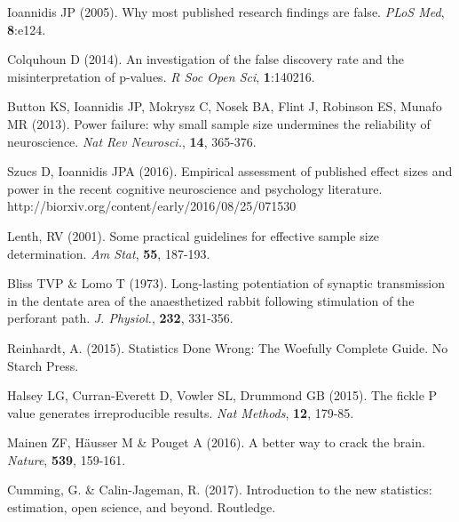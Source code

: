 \documentclass[a4paper,11pt]{article}
\begin{document}
\begin{thebibliography}{199}

Ioannidis JP (2005).
Why most published research findings are false.
{\em PLoS Med}, {\bf 8}:e124. 

Colquhoun D (2014).
An investigation of the false discovery rate and the misinterpretation of p-values.
{\em R Soc Open Sci}, {\bf 1}:140216. 

Button KS, Ioannidis JP, Mokrysz C, Nosek BA, Flint J, Robinson ES,
Munafo MR (2013).
Power failure: why small sample size undermines the reliability of neuroscience.
{\em Nat Rev Neurosci.}, {\bf 14}, 365-376. 

Szucs D, Ioannidis JPA (2016).
Empirical assessment of published effect sizes and power in the recent
cognitive neuroscience and psychology literature.
http://biorxiv.org/content/early/2016/08/25/071530

Lenth, RV (2001).
Some practical guidelines for effective sample size determination.
{\em Am Stat}, {\bf 55}, 187-193.

Bliss TVP \& Lomo T (1973).
Long-lasting potentiation of synaptic transmission in the dentate area
of the anaesthetized rabbit following stimulation of the perforant
path.
{\em J. Physiol.}, {\bf 232}, 331-356.

Reinhardt, A. (2015).
Statistics Done Wrong: The Woefully Complete Guide. No Starch Press.

Halsey LG, Curran-Everett D, Vowler SL, Drummond GB (2015).
The fickle P value generates irreproducible results.
{\em Nat Methods}, {\bf 12}, 179-85. 

Mainen ZF, H\"ausser M \& Pouget A (2016).
A better way to crack the brain.
{\em Nature}, {\bf 539}, 159-161.

Cumming, G. \& Calin-Jageman, R. (2017).
Introduction to the new statistics: estimation, open science, and beyond.
Routledge.



\end{thebibliography}
\end{document}
